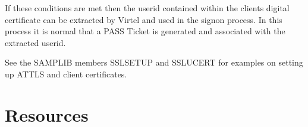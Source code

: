 \documentclass[letterpaper,10pt,english]{sphinxmanual}
\begin{document}
\sphinxAtStartPar
If these conditions are met then the userid contained within the clients digital certificate can be extracted by Virtel and used in the signon process. In this process it is normal that a PASS Ticket is generated and associated with the extracted userid.

\sphinxAtStartPar
See the SAMPLIB members SSLSETUP and SSLUCERT for examples on setting up AT\sphinxhyphen{}TLS and client certificates.

\newpage

\ignorespaces 

\section{Resources}
\label{\detokenize{connectivity_guide:resources}}\label{\detokenize{connectivity_guide:index-162}}
\end{document}
